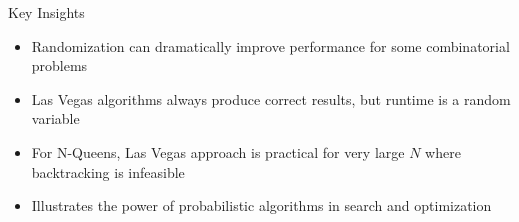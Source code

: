 \begin{frame}{Key Insights}
  \begin{itemize}
    \item Randomization can dramatically improve performance for some combinatorial problems
    \item Las Vegas algorithms always produce correct results, but runtime is a random variable
    \item For N-Queens, Las Vegas approach is practical for very large $N$ where backtracking is infeasible
    \item Illustrates the power of probabilistic algorithms in search and optimization
  \end{itemize}
\end{frame}